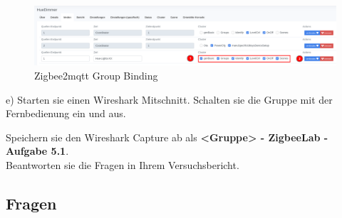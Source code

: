 \begin{figure}[H]
    \centering
    \includegraphics[width=1\textwidth]{media/Z2M-Group-Binding.png}
    \caption{Zigbee2mqtt Group Binding}
\end{figure}

e) Starten sie einen Wireshark Mitschnitt. Schalten sie die Gruppe mit der Fernbedienung ein und aus.

\begin{Aufgabe}
    Speichern sie den Wireshark Capture ab als \textbf{\grqq <Gruppe> - ZigbeeLab - Aufgabe 5.1\grqq{}}. \\
    Beantworten sie die Fragen in Ihrem Versuchsbericht.
\end{Aufgabe}

\subsection{Fragen}

